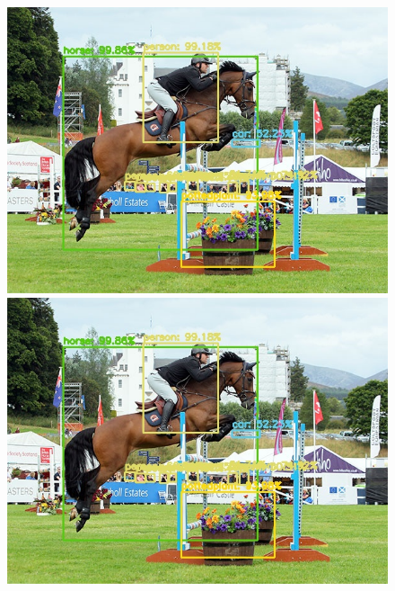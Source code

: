 \begin{figure}		%
	\centering
	\begin{minipage}{.49\textwidth}
		\centering
		\includegraphics[width=1\linewidth]{images/ex1_yolo}
	\end{minipage}
	\begin{minipage}{.49\textwidth}
		\centering
		\includegraphics[width=1\linewidth]{images/ex1_yolo}
	\end{minipage}
\end{figure}